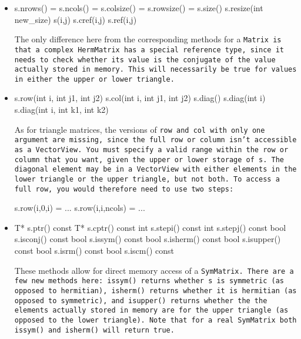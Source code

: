 \begin{itemize}

\item
\begin{tmvcode}
s.nrows() = s.ncols() = s.colsize() = s.rowsize() = s.size()
s.resize(int new_size)
s(i,j)
s.cref(i,j)
s.ref(i,j)
\end{tmvcode}
The only difference here from the corresponding methods for a \tt{Matrix} is that a complex \tt{HermMatrix} has a special reference type, since it needs to check whether its value is the conjugate of the value actually stored in memory.  This will necessarily be true for values in either the upper or lower triangle.

\item
\begin{tmvcode}
s.row(int i, int j1, int j2)
s.col(int i, int j1, int j2)
s.diag()
s.diag(int i)
s.diag(int i, int k1, int k2)
\end{tmvcode}
As for triangle matrices, the versions of \tt{row} and \tt{col} with only one argument are
missing, since the full row or column isn't accessible as a \tt{VectorView}.
You must specify a valid range within the row or column that you want, 
given the upper or lower storage of \tt{s}.
The diagonal element may be in a \tt{VectorView} with either elements in the 
lower triangle or the upper triangle, but not both.  To access a full row, you would 
therefore need to use two steps:
\begin{tmvcode}
s.row(i,0,i) = ...
s.row(i,i,ncols) = ...
\end{tmvcode}

\item
\begin{tmvcode}
T* s.ptr()
const T* s.cptr() const
int s.stepi() const
int s.stepj() const
bool s.isconj() const
bool s.issym() const
bool s.isherm() const
bool s.isupper() const
bool s.isrm() const
bool s.iscm() const
\end{tmvcode}
These methods allow for direct memory access of a \tt{SymMatrix}.  There are a few new methods here: \tt{issym()} returns whether \tt{s} is symmetric (as opposed to hermitian), \tt{isherm()} returns whether it is hermitian (as opposed to symmetric), and \tt{isupper()} returns whether the the elements actually stored in memory are for the upper triangle (as opposed to the lower triangle).  Note that for a real \tt{SymMatrix} both \tt{issym()} and \tt{isherm()} will return \tt{true}.


\end{itemize}
